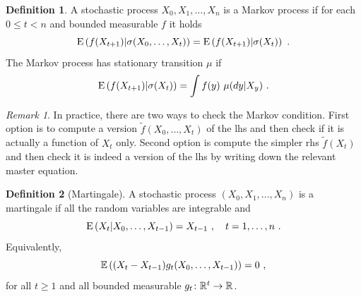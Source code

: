 \documentclass[12pt,a4paper]{amsart}
\theoremstyle{plain}%
\theoremstyle{definition}
\newtheorem{definition}{Definition}%
\theoremstyle{remark}
\newtheorem{remark}{Remark}
\begin{document}
\begin{definition}
A stochastic process $X_0,X_1,\dots,X_n$ is a Markov process if for
each $0 \leq t < n$ and bounded measurable $f$ it holds
\begin{equation*}
       \operatorname{E}\left(f(X_{t+1}) \middle| \sigma(X_0,\dots,X_t)\right) =
  \operatorname{E}\left(f(X_{t+1}) \middle| \sigma(X_t)\right) \ .
\end{equation*}
The Markov process has stationary transition $\mu$ if
\begin{equation*}
  \operatorname{E}\left(f(X_{t+1}) \middle| \sigma(X_t)\right) = \int f(y) \ \mu(dy|X_y) \ .
\end{equation*}

\begin{remark}\label{rem:howto}
In practice, there are two ways to check the Markov condition. First
option is to compute a version $\widetilde f(X_0,\dots,X_t)$ of the lhs and then check if it is
actually a function of $X_t$ only. Second option is compute the
simpler rhs $\widetilde f(X_t)$ and then check it is indeed a version
of the lhs by writing down the relevant master equation.   
\end{remark}

\end{definition}
\begin{definition}[Martingale]
  A stochastic process $(X_0,X_1, \dots, X_n)$ is a martingale if all
  the random variables are integrable and
  \begin{equation*}
    \operatorname{E}\left(X_t \middle| X_0,\dots,X_{t-1}\right) = X_{t-1}\ , \quad t=1,\dots,n \ .
  \end{equation*}
Equivalently, 
\begin{equation*}
  \operatorname{\mathbb E}\left((X_t-X_{t-1})g_t(X_0,\dots,X_{t-1})\right) = 0 \ ,
\end{equation*}
for all $t\geq1$ and all bounded measurable $g_t \colon \mathbb{R}^{t} \to \mathbb{R}$.
\end{definition}
\end{document}
